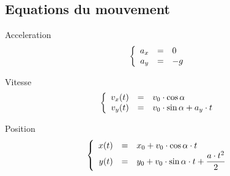 \documentclass[12pt,a4paper]{article} %
\begin{document}
\subsection{Equations du mouvement}
\begin{twocols}[0.5][0.5]
	Acceleration
	\begin{equation*}
	\left\{
		\begin{array}{rcl}
			a_x & = & 0 \\
			a_y & = & -g \\
		\end{array}
	\right.
	\end{equation*}
	\par\vspace{1em}
	Vitesse
	\begin{equation*}
	\left\{
		\begin{array}{rcl}
			v_x(t) & = & v_0 \cdot \cos{\alpha} \\
			v_y(t) & = & v_0 \cdot \sin{\alpha}+a_y \cdot t \\
		\end{array}
	\right.
	\end{equation*}
\nextcol

	Position
	\begin{equation*}
	\left\{
		\begin{array}{rcl}
			x(t) & = & x_0+v_0 \cdot \cos{\alpha} \cdot t \\
			y(t) & = & y_0+v_0 \cdot \sin{\alpha} \cdot t+{\displaystyle\frac{a \cdot t^2}{2}} \\
		\end{array}
	\right.
	\end{equation*}

\end{twocols}
\end{document}
